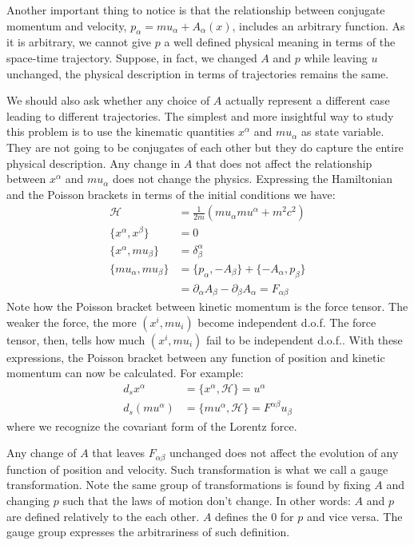 \documentclass[aps,pra,10pt,twocolumn,floatfix,nofootinbib]{revtex4-1}
\numberwithin{equation}{section}
\theoremstyle{definition}
\begin{document}
Another important thing to notice is that the relationship between conjugate momentum and velocity, $p_\alpha = m u_\alpha + A_\alpha(x)$, includes an arbitrary function. As it is arbitrary, we cannot give $p$ a well defined physical meaning in terms of the space-time trajectory. Suppose, in fact, we changed $A$ and $p$ while leaving $u$ unchanged, the physical description in terms of trajectories remains the same.

We should also ask whether any choice of $A$ actually represent a different case leading to different trajectories. The simplest and more insightful way to study this problem is to use the kinematic quantities $x^\alpha$ and $mu_\alpha$ as state variable. They are not going to be conjugates of each other but they do capture the entire physical description. Any change in $A$ that does not affect the relationship between $x^\alpha$ and $mu_\alpha$ does not change the physics. Expressing the Hamiltonian and the Poisson brackets in terms of the initial conditions we have:
\begin{align*}
\mathcal{H}&=\frac{1}{2m}(mu_\alpha mu^\alpha + m^2 c^2) \\
\{x^\alpha, x^\beta\} &= 0 \\
\{x^\alpha, mu_\beta\} &= \delta^\alpha_\beta \\
\{mu_\alpha, mu_\beta\} &= \{p_\alpha, - A_\beta\} + \{-A_\alpha, p_\beta\} \\
&= \partial_\alpha A_\beta - \partial_\beta A_\alpha = F_{\alpha\beta}
\end{align*}
Note how the Poisson bracket between kinetic momentum is the force tensor. The weaker the force, the more $(x^i, mu_i)$ become independent d.o.f. The force tensor, then, tells how much $(x^i, mu_i)$ fail to be independent d.o.f.. With these expressions, the Poisson bracket between any function of position and kinetic momentum can now be calculated. For example:
\begin{align*}
d_s x^\alpha &= \{x^\alpha, \mathcal{H}\} = u^\alpha \\
d_s (mu^\alpha) &= \{mu^\alpha, \mathcal{H}\} = F^{\alpha\beta} u_\beta
\end{align*}
where we recognize the covariant form of the Lorentz force.

Any change of $A$ that leaves $F_{\alpha\beta}$ unchanged does not affect the evolution of any function of position and velocity. Such transformation is what we call a gauge transformation. Note the same group of transformations is found by fixing $A$ and changing $p$ such that the laws of motion don't change. In other words: $A$ and $p$ are defined relatively to the each other. $A$ defines the $0$ for $p$ and vice versa. The gauge group expresses the arbitrariness of such definition.
\end{document}
